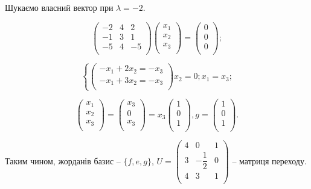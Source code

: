 Шукаємо власний вектор при $\lambda = -2$.

$$\begin{pmatrix}
	-2 & 4 & 2 \\
	-1 & 3 & 1 \\
	-5 & 4 & -5 \\
\end{pmatrix} \begin{pmatrix}
	x_1 \\
	x_2 \\
	x_3 \\
\end{pmatrix} = \begin{pmatrix}
	0 \\
	0 \\
	0 \\
\end{pmatrix};$$

$$\left\{ \begin{pmatrix}
	-x_1 + 2x_2 = -x_3 \\
	-x_1 + 3x_2 = -x_3 \\
\end{pmatrix} \right. x_2 = 0; x_1 = x_3;$$

$$\begin{pmatrix}
	x_1 \\
	x_2 \\
	x_3 \\
\end{pmatrix} = \begin{pmatrix}
	x_3 \\
	0 \\
	x_3 \\
\end{pmatrix} = x_3 \begin{pmatrix}
	1 \\
	0 \\
	1 \\
\end{pmatrix}, g = \begin{pmatrix}
	1 \\
	0 \\
	1 \\
\end{pmatrix}.$$

Таким чином, жорданів базис -- $\{f, e, g\}$, $U = \begin{pmatrix}
	4 & 0             & 1 \\
	3 & -\dfrac{1}{2} & 0 \\
	4 & 3             & 1 \\
\end{pmatrix} $ -- матриця переходу.

